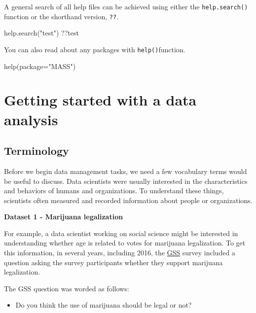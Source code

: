 \documentclass[
]{book}
\newenvironment{Shaded}{\begin{snugshade}}{\end{snugshade}}
\newcommand{\AttributeTok}[1]{\textcolor[rgb]{0.77,0.63,0.00}{#1}}
\newcommand{\FunctionTok}[1]{\textcolor[rgb]{0.00,0.00,0.00}{#1}}
\newcommand{\NormalTok}[1]{#1}
\newcommand{\StringTok}[1]{\textcolor[rgb]{0.31,0.60,0.02}{#1}}
\providecommand{\tightlist}{%
  \setlength{\itemsep}{0pt}\setlength{\parskip}{0pt}}
\begin{document}
A general search of all help files can be achieved using either the \texttt{help.search()} function or the shorthand version, \texttt{??}.

\begin{Shaded}
\begin{Highlighting}[]
\FunctionTok{help.search}\NormalTok{(}\StringTok{"test"}\NormalTok{)}
\NormalTok{??test}
\end{Highlighting}
\end{Shaded}

You can also read about any packages with \texttt{help()}function.

\begin{Shaded}
\begin{Highlighting}[]
\FunctionTok{help}\NormalTok{(}\AttributeTok{package=}\StringTok{"MASS"}\NormalTok{)}
\end{Highlighting}
\end{Shaded}

\hypertarget{getting-started-with-a-data-analysis}{%
\chapter{Getting started with a data analysis}\label{getting-started-with-a-data-analysis}}

\hypertarget{terminology}{%
\section{Terminology}\label{terminology}}

Before we begin data management tasks, we need a few vocabulary terms
would be useful to discuss. Data scientists were usually interested in
the characteristics and behaviors of humans and organizations. To
understand these things, scientists often measured and recorded
information about people or organizations.

\textbf{Dataset 1 - Marijuana legalization}

For example, a data scientist working on social science might be
interested in understanding whether age is related to votes for
marijuana legalization. To get this information, in several years,
including 2016, the \href{https://gssdataexplorer.norc.org}{GSS} survey
included a question asking the survey participants whether they support
marijuana legalization.

The GSS question was worded as follows:

\begin{itemize}
\tightlist
\item
  Do you think the use of marijuana should be legal or not?
\end{itemize}
\end{document}
